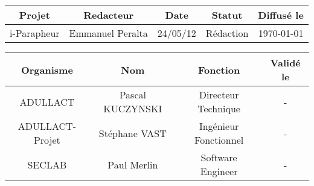 \begin{titlepage}
\begin{center}
\begin{tabular}{ccccc}
	\textbf{Projet} & \textbf{Redacteur} & \textbf{Date} & \textbf{Statut} & \textbf{Diffusé le} \\
	\hline
	i-Parapheur & Emmanuel Peralta & 24/05/12 & Rédaction & \today \\
\end{tabular}
\vfill
\begin{tabular}{cccc}
	\textbf{Organisme} & \textbf{Nom} & \textbf{Fonction} & \textbf{Validé le}\\
	\hline
	ADULLACT & Pascal KUCZYNSKI & Directeur Technique & - \\
	ADULLACT-Projet & Stéphane VAST & Ingénieur Fonctionnel & -\\
	SECLAB & Paul Merlin & Software Engineer & -\\
\end{tabular}

\end{center}
\end{titlepage}
